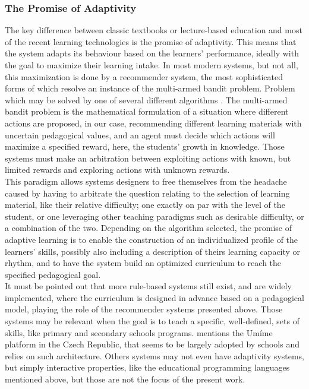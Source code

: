         \subsubsection{The Promise of Adaptivity}
The key difference between classic textbooks or lecture-based education and most of the recent learning technologies is the promise of adaptivity. This means that the system adapts its behaviour based on the learners' performance, ideally with the goal to maximize their learning intake. In most modern systems, but not all, this maximization is done by a recommender system, the most sophisticated forms of which resolve an instance of the multi-armed bandit problem. Problem which may be solved by one of several different algorithms \parencite{chen_recommendation_2017}. The multi-armed bandit problem is the mathematical formulation of a situation where different actions are proposed, in our case, recommending different learning materials with uncertain pedagogical values, and an agent must decide which actions will maximize a specified reward, here, the students' growth in knowledge. Those systems must make an arbitration between exploiting actions with known, but limited rewards and exploring actions with unknown rewards.\\
This paradigm allows systems designers to free themselves from the headache caused by having to arbitrate the question relating to the selection of learning material, like their relative difficulty; one exactly on par with the level of the student, or one leveraging other teaching paradigms such as desirable difficulty, or a combination of the two. Depending on the algorithm selected, the promise of adaptive learning is to enable the construction of an individualized profile of the learners' skills, possibly also including a description of theirs learning capacity or rhythm, and to have the system build an optimized curriculum to reach the specified pedagogical goal.\\
It must  be pointed out that more rule-based systems still exist, and are widely implemented, where the curriculum is designed in advance based on a pedagogical model, playing the role of the recommender systems presented above. Those systems may be relevant when the goal is to teach a specific, well-defined, sets of skills, like primary and secondary schools programs. \textcite{pelanek_adaptive_2025} mentions the Umíme platform in the Czech Republic, that seems to be largely adopted by schools and relies on such architecture. Others systems may not even have adaptivity systems, but simply interactive properties, like the educational programming languages mentioned above, but those are not the focus of the present work.\\

